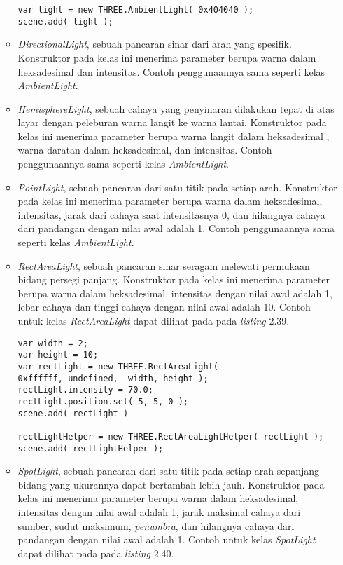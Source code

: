 \begin{itemize}
\begin{itemize}
\begin{lstlisting}[caption={Contoh penggunaan kelas {\it AmbientLight}.},captionpos=b]
var light = new THREE.AmbientLight( 0x404040 ); 
scene.add( light );
\end{lstlisting}
	
	\item {\it DirectionalLight}, sebuah pancaran sinar dari arah yang spesifik. Konstruktor pada kelas ini menerima parameter berupa warna dalam heksadesimal dan intensitas. Contoh penggunaannya sama seperti kelas {\it AmbientLight}.

	\item {\it HemisphereLight}, sebuah cahaya yang penyinaran dilakukan tepat di atas layar dengan peleburan warna langit ke warna lantai. Konstruktor pada kelas ini menerima parameter berupa warna langit dalam heksadesimal , warna daratan dalam heksadesimal, dan intensitas. Contoh penggunaannya sama seperti kelas {\it AmbientLight}.

	\item {\it PointLight}, sebuah pancaran dari satu titik pada setiap arah. Konstruktor pada kelas ini menerima parameter berupa warna dalam heksadesimal, intensitas, jarak dari cahaya saat intensitasnya 0, dan hilangnya cahaya dari pandangan dengan nilai awal adalah 1. Contoh penggunaannya sama seperti kelas {\it AmbientLight}.
	
	\item {\it RectAreaLight}, sebuah pancaran sinar seragam melewati permukaan bidang persegi panjang. Konstruktor pada kelas ini menerima parameter berupa warna dalam heksadesimal, intensitas dengan nilai awal adalah 1, lebar cahaya dan tinggi cahaya dengan nilai awal adalah 10. Contoh untuk kelas {\it RectAreaLight} dapat dilihat pada pada {\it listing} 2.39.
	
\begin{lstlisting}[caption={Contoh penggunaan kelas {\it RectAreaLight}.},captionpos=b]
var width = 2;
var height = 10;
var rectLight = new THREE.RectAreaLight(
0xffffff, undefined,  width, height );
rectLight.intensity = 70.0;
rectLight.position.set( 5, 5, 0 );
scene.add( rectLight )

rectLightHelper = new THREE.RectAreaLightHelper( rectLight );
scene.add( rectLightHelper );
\end{lstlisting}

	\item {\it SpotLight}, sebuah pancaran dari satu titik pada setiap arah sepanjang bidang yang ukurannya dapat bertambah lebih jauh. Konstruktor pada kelas ini menerima parameter berupa warna dalam heksadesimal, intensitas dengan nilai awal adalah 1, jarak maksimal cahaya dari sumber, sudut maksimum, {\it penumbra}, dan hilangnya cahaya dari pandangan dengan nilai awal adalah 1. Contoh untuk kelas {\it SpotLight} dapat dilihat pada pada {\it listing} 2.40.
	

\end{itemize}
\end{itemize}
